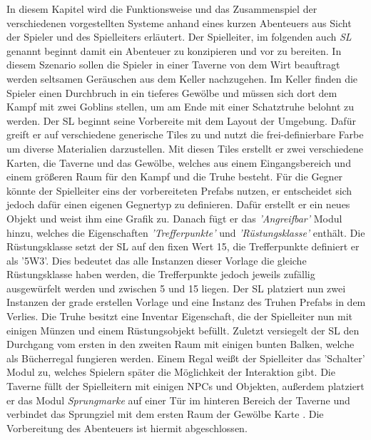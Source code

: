 In diesem Kapitel wird die Funktionsweise und das Zusammenspiel der verschiedenen vorgestellten Systeme anhand eines kurzen Abenteuers aus Sicht der Spieler und des Spielleiters erläutert.\newline
Der Spielleiter, im folgenden auch \emph{SL} genannt beginnt damit ein Abenteuer zu konzipieren und vor zu bereiten. In diesem Szenario sollen die Spieler in einer Taverne von dem Wirt beauftragt werden seltsamen Geräuschen aus dem Keller nachzugehen. Im Keller finden die Spieler einen Durchbruch in ein tieferes Gewölbe und müssen sich dort dem Kampf mit zwei Goblins stellen, um am Ende mit einer Schatztruhe belohnt zu werden.\newline
Der SL beginnt seine Vorbereite mit dem Layout der Umgebung. Dafür greift er auf verschiedene generische Tiles zu und nutzt die frei-definierbare Farbe um diverse Materialien darzustellen. Mit diesen Tiles erstellt er zwei verschiedene Karten, die Taverne und das Gewölbe, welches aus einem Eingangsbereich und einem größeren Raum für den Kampf und die Truhe besteht. Für die Gegner könnte der Spielleiter eins der vorbereiteten Prefabs nutzen, er entscheidet sich jedoch dafür einen eigenen Gegnertyp zu definieren. Dafür erstellt er ein neues Objekt und weist ihm eine Grafik zu. Danach fügt er das \emph{'Angreifbar'} Modul hinzu, welches die Eigenschaften \emph{'Trefferpunkte'} und \emph{'Rüstungsklasse'} enthält. Die Rüstungsklasse setzt der SL auf den fixen Wert 15, die Trefferpunkte definiert er als '5W3'. Dies bedeutet das alle Instanzen dieser Vorlage die gleiche Rüstungsklasse haben werden, die Trefferpunkte jedoch jeweils zufällig ausgewürfelt werden und zwischen 5 und 15 liegen.\newline
Der SL platziert nun zwei Instanzen der grade erstellen Vorlage und eine Instanz des Truhen Prefabs in dem Verlies. Die Truhe besitzt eine Inventar Eigenschaft, die der Spielleiter nun mit einigen Münzen und einem Rüstungsobjekt befüllt. Zuletzt versiegelt der SL den Durchgang vom ersten in den zweiten Raum mit einigen bunten Balken, welche als Bücherregal fungieren werden. Einem Regal weißt der Spielleiter das 'Schalter' Modul zu, welches Spielern später die Möglichkeit der Interaktion gibt.\newline
Die Taverne füllt der Spielleitern mit einigen NPCs und Objekten, außerdem platziert er das Modul \emph{Sprungmarke} auf einer Tür im hinteren Bereich der Taverne und verbindet das Sprungziel mit dem ersten Raum der Gewölbe Karte . \newline
Die Vorbereitung des Abenteuers ist hiermit abgeschlossen.

